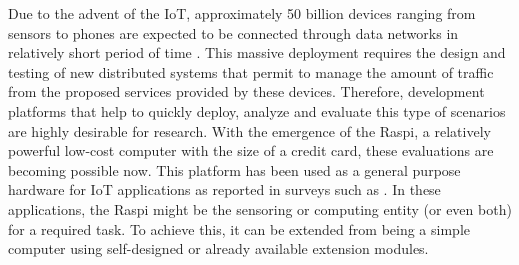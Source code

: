 %

Due to the advent of the \ac{IoT}, approximately 50 billion devices
ranging from sensors to phones are expected to be connected through
data networks in relatively short period of time \cite{cisco2011forecast}.
This massive deployment requires the design and testing of new
distributed systems that permit to manage the amount of traffic
from the proposed services provided by these devices. Therefore,
development platforms that help to quickly deploy, analyze and
evaluate this type of scenarios are highly desirable for research.
With the emergence of the \ac{Raspi}, a relatively powerful low-cost
computer with the size of a credit card, these evaluations are becoming
possible now. This platform has been used as a general purpose hardware
for \ac{IoT} applications as reported in surveys such as
\cite{alfuqaha2015iot}. In these applications, the
\ac{Raspi} might be the sensoring or computing entity (or even both) for
a required task. To achieve this, it can be extended from being a
simple computer using self-designed or already available extension modules.

